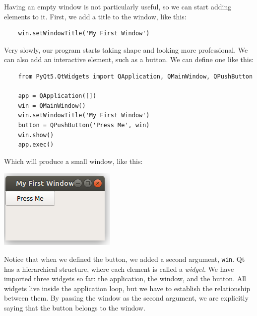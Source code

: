 
Having an empty window is not particularly useful, so we can start adding elements to it. First, we add a title to the window, like this:

\begin{verbatim}
    win.setWindowTitle('My First Window')
\end{verbatim}

Very slowly, our program starts taking shape and looking more professional. We can also add an interactive element, such as a button. We can define one like this:

\begin{verbatim}
    from PyQt5.QtWidgets import QApplication, QMainWindow, QPushButton

    app = QApplication([])
    win = QMainWindow()
    win.setWindowTitle('My First Window')
    button = QPushButton('Press Me', win)
    win.show()
    app.exec()
\end{verbatim}

Which will produce a small window, like this:

\begin{center}
    \includegraphics[width=.3\textwidth]{images/Chapter_08/02_simple_window_and_button.png}
\end{center}

Notice that when we defined the button, we added a second argument, \texttt{win}. Qt has a hierarchical structure, where each element is called a \emph{widget}. We have imported three widgets so far: the application, the window, and the button. All widgets live inside the application loop, but we have to establish the relationship between them. By passing the window as the second argument, we are explicitly saying that the button belongs to the window.


